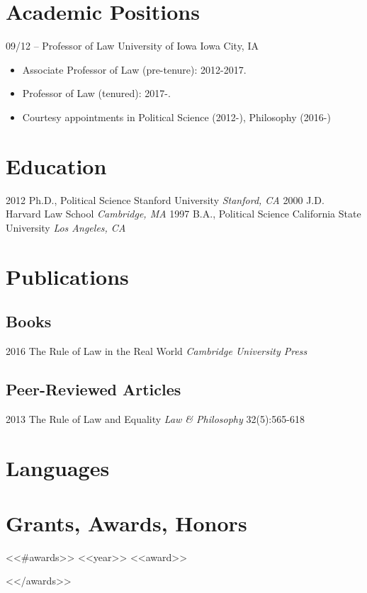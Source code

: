 \documentclass[letterpaper]{moderncv}
\begin{document}
\makecvtitle
%
%
\section{Academic Positions}
\cventry
{09/12 -- }
{Professor of Law}
{University of Iowa}
{Iowa City, IA}
{}
{\begin{itemize}%
	\item Associate Professor of Law (pre-tenure): 2012-2017.
	\item Professor of Law (tenured): 2017-.
	\item Courtesy appointments in Political Science (2012-), Philosophy (2016-)
	\end{itemize}}
%
%
\section{Education}
\cventry
{2012}
{Ph.D., Political Science}
{Stanford University}
{}
{\textit{Stanford, CA}}
{}
\cventry
{2000}
{J.D.}
{Harvard Law School}
{}
{\textit{Cambridge, MA}}
{}
\cventry
{1997}
{B.A., Political Science}
{California State University}
{}
{\textit{Los Angeles, CA}}
{}
%
%
\section{Publications}
\subsection{Books}
\cventry
{2016}
{The Rule of Law in the Real World}
{}
{\textit{Cambridge University Press}}
{}
{}
\vspace{1mm}
\subsection{Peer-Reviewed Articles}
\cventry
{2013}
{The Rule of Law and Equality}
{}
{\textit{Law \& Philosophy}}
{}
{32(5):565-618}
\vspace{1mm}
%
%
\section{Languages}


\section{Grants, Awards, Honors}
<<#awards>>
\cvitem
{<<year>>}
{<<award>>}
\vspace{1mm}

<</awards>>

\ 
\end{document}

